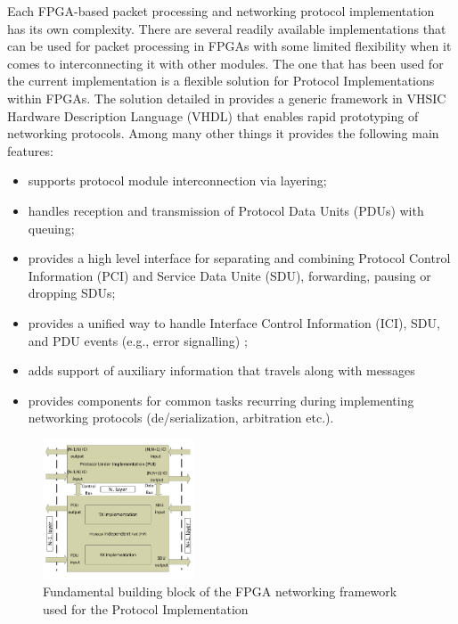 \documentclass[journal]{IEEEtran}
\begin{document}
Each FPGA-based packet processing and networking protocol implementation has its own complexity. There are several
readily available implementations that can be used for packet processing in FPGAs with some limited flexibility when it
comes to interconnecting it
with other modules. The one that has been used for the current implementation is a flexible solution for Protocol
Implementations within FPGAs. The solution detailed in \cite{ProtoImpl} provides a generic framework in VHSIC Hardware
Description Language (VHDL) that enables rapid prototyping of networking protocols. Among many other things it provides
the following main features:
\begin{itemize}
    \renewcommand \labelitemi{--}
    \item supports protocol module interconnection via layering;
    \item handles reception and transmission of Protocol Data Units (PDUs) with queuing;
    \item provides a high level interface for separating and combining	Protocol Control Information (PCI) and Service Data Unite (SDU),
          forwarding, pausing or dropping SDUs;
    \item provides a unified way to handle Interface Control Information (ICI), SDU, and PDU events (e.g., error signalling) \cite{ISO:OSI};
    \item adds support of auxiliary information that travels along with messages
    \item provides components for common tasks recurring during implementing networking protocols
          (de/serialization, arbitration etc.).
\end{itemize}

\begin{figure}[!htb]
    \centering
    \includegraphics[width=0.4\textwidth]{figures_raw/system_sketch.pdf}
    \caption{Fundamental building block of the FPGA networking framework used for the Protocol Implementation}
    \label{fig:system_sketch}
\end{figure}
\end{document}
